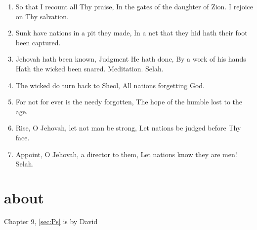 \documentclass[]{article}
\begin{document}
\begin{enumerate}
\item So that I recount all Thy praise, In the gates of the daughter of Zion. I rejoice on Thy salvation.

\item Sunk have nations in a pit they made, In a net that they hid hath their foot been captured.

\item Jehovah hath been known, Judgment He hath done, By a work of his hands Hath the wicked been snared. Meditation. Selah.

\item The wicked do turn back to Sheol, All nations forgetting God.

\item For not for ever is the needy forgotten, The hope of the humble lost to the age.

\item Rise, O Jehovah, let not man be strong, Let nations be judged before Thy face.

\item Appoint, O Jehovah, a director to them, Let nations know they are men! Selah.

\end{enumerate}
\section{about}
Chapter 9, \ref{sec:Ps} is by David
\end{document}
